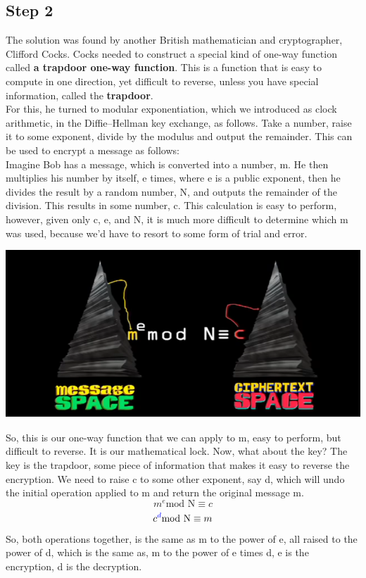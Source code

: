 \documentclass{report}
\begin{document}
\subsection{Step 2}
The solution was found by another British mathematician and cryptographer, Clifford Cocks. Cocks needed to construct a special kind of one-way function called \textbf{a trapdoor one-way function}. This is a function that is easy to compute in one direction, yet difficult to reverse, unless you have special information, called the \textbf{trapdoor}.\\
For this, he turned to modular exponentiation, which we introduced as clock arithmetic, in the Diffie–Hellman key exchange, as follows. Take a number, raise it to some exponent, divide by the modulus and output the remainder. This can be used to encrypt a message as follows: \\
Imagine Bob has a message, which is converted into a number, m. He then multiplies his number by itself, e times, where e is a public exponent, then he divides the result by a random number, N, and outputs the remainder of the division. This results in some number, c. This calculation is easy to perform, however, given only c, e, and N, it is much more difficult to determine which m was used, because we'd have to resort to some form of trial and error. 
\begin{center}
	\includegraphics[scale=1]{32.png}
\end{center}
So, this is our one-way function that we can apply to m, easy to perform, but difficult to reverse. It is our mathematical lock. Now, what about the key? The key is the trapdoor, some piece of information that makes it easy to reverse the encryption. We need to raise c to some other exponent, say d, which will undo the initial operation applied to m and return the original message m.
$$m^e \text{mod N} \equiv c$$
$$c^{\color{blue}d} \text{mod N} \equiv m$$
 So, both operations together, is the same as m to the power of e, all raised to the power of d, which is the same as, m to the power of e times d, e is the encryption, d is the decryption.
\end{document}
